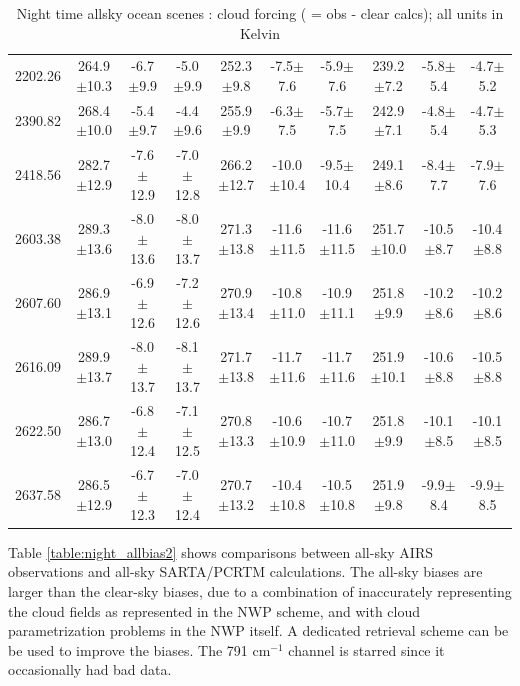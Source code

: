 \documentclass[agupp]{aguplus}              %
\newcommand{\wn}{cm$^{-1}$\xspace}
\begin{document}
\begin{article}
\begin{center}
\begin{table}[ht]
{\begin{tabular}{c|ccc|ccc|ccc}
2202.26 & 264.9$\pm$10.3 & -6.7$\pm$9.9 & -5.0$\pm$9.9 & 252.3$\pm$9.8 & -7.5$\pm$7.6 & -5.9$\pm$7.6 & 239.2$\pm$7.2 & -5.8$\pm$5.4 & -4.7$\pm$5.2 \\ 
2390.82 & 268.4$\pm$10.0 & -5.4$\pm$9.7 & -4.4$\pm$9.6 & 255.9$\pm$9.9 & -6.3$\pm$7.5 & -5.7$\pm$7.5 & 242.9$\pm$7.1 & -4.8$\pm$5.4 & -4.7$\pm$5.3 \\ 
\hline
2418.56 & 282.7$\pm$12.9 & -7.6$\pm$12.9 & -7.0$\pm$12.8 & 266.2$\pm$12.7 & -10.0$\pm$10.4 & -9.5$\pm$10.4 & 249.1$\pm$8.6 & -8.4$\pm$7.7 & -7.9$\pm$7.6 \\ 
2603.38 & 289.3$\pm$13.6 & -8.0$\pm$13.6 & -8.0$\pm$13.7 & 271.3$\pm$13.8 & -11.6$\pm$11.5 & -11.6$\pm$11.5 & 251.7$\pm$10.0 & -10.5$\pm$8.7 & -10.4$\pm$8.8 \\ 
2607.60 & 286.9$\pm$13.1 & -6.9$\pm$12.6 & -7.2$\pm$12.6 & 270.9$\pm$13.4 & -10.8$\pm$11.0 & -10.9$\pm$11.1 & 251.8$\pm$9.9 & -10.2$\pm$8.6 & -10.2$\pm$8.6 \\ 
2616.09 & 289.9$\pm$13.7 & -8.0$\pm$13.7 & -8.1$\pm$13.7 & 271.7$\pm$13.8 & -11.7$\pm$11.6 & -11.7$\pm$11.6 & 251.9$\pm$10.1 & -10.6$\pm$8.8 & -10.5$\pm$8.8 \\ 
2622.50 & 286.7$\pm$13.0 & -6.8$\pm$12.4 & -7.1$\pm$12.5 & 270.8$\pm$13.3 & -10.6$\pm$10.9 & -10.7$\pm$11.0 & 251.8$\pm$9.9 & -10.1$\pm$8.5 & -10.1$\pm$8.5 \\ 
2637.58 & 286.5$\pm$12.9 & -6.7$\pm$12.3 & -7.0$\pm$12.4 & 270.7$\pm$13.2 & -10.4$\pm$10.8 & -10.5$\pm$10.8 & 251.9$\pm$9.8 & -9.9$\pm$8.4 & -9.9$\pm$8.5 \\ 
\hline
\end{tabular}}
\hfill{}
\caption{Night time allsky ocean scenes : cloud forcing ( = obs - clear calcs); all units in Kelvin}
\label{table:night_all2} %
\end{table}
\end{center}


Table \ref{table:night_allbias2} shows comparisons between all-sky
AIRS observations and all-sky SARTA/PCRTM calculations. The all-sky
biases are larger than the clear-sky biases, due to a combination of
inaccurately representing the cloud fields as represented in the NWP
scheme, and with cloud parametrization problems in the NWP itself. A
dedicated retrieval scheme can be be used to improve the biases. The
791 \wn channel is starred since it occasionally had bad data.


\end{article}
\end{document}
